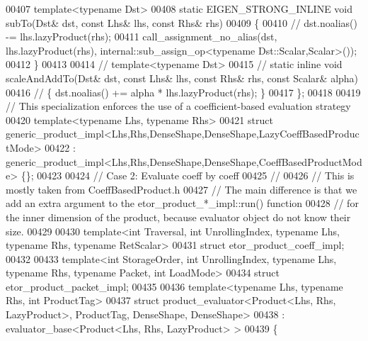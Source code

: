 \begin{DoxyCode}
00407   \textcolor{keyword}{template}<\textcolor{keyword}{typename} Dst>
00408   \textcolor{keyword}{static} EIGEN\_STRONG\_INLINE \textcolor{keywordtype}{void} subTo(Dst& dst, \textcolor{keyword}{const} Lhs& lhs, \textcolor{keyword}{const} Rhs& rhs)
00409   \{
00410     \textcolor{comment}{// dst.noalias() -= lhs.lazyProduct(rhs);}
00411     call\_assignment\_no\_alias(dst, lhs.lazyProduct(rhs), internal::sub\_assign\_op<typename
       Dst::Scalar,Scalar>());
00412   \}
00413   
00414 \textcolor{comment}{//   template<typename Dst>}
00415 \textcolor{comment}{//   static inline void scaleAndAddTo(Dst& dst, const Lhs& lhs, const Rhs& rhs, const Scalar& alpha)}
00416 \textcolor{comment}{//   \{ dst.noalias() += alpha * lhs.lazyProduct(rhs); \}}
00417 \};
00418 
00419 \textcolor{comment}{// This specialization enforces the use of a coefficient-based evaluation strategy}
00420 \textcolor{keyword}{template}<\textcolor{keyword}{typename} Lhs, \textcolor{keyword}{typename} Rhs>
00421 \textcolor{keyword}{struct }generic\_product\_impl<Lhs,Rhs,DenseShape,DenseShape,LazyCoeffBasedProductMode>
00422   : generic\_product\_impl<Lhs,Rhs,DenseShape,DenseShape,CoeffBasedProductMode> \{\};
00423 
00424 \textcolor{comment}{// Case 2: Evaluate coeff by coeff}
00425 \textcolor{comment}{//}
00426 \textcolor{comment}{// This is mostly taken from CoeffBasedProduct.h}
00427 \textcolor{comment}{// The main difference is that we add an extra argument to the etor\_product\_*\_impl::run() function}
00428 \textcolor{comment}{// for the inner dimension of the product, because evaluator object do not know their size.}
00429 
00430 \textcolor{keyword}{template}<\textcolor{keywordtype}{int} Traversal, \textcolor{keywordtype}{int} UnrollingIndex, \textcolor{keyword}{typename} Lhs, \textcolor{keyword}{typename} Rhs, \textcolor{keyword}{typename} RetScalar>
00431 \textcolor{keyword}{struct }etor\_product\_coeff\_impl;
00432 
00433 \textcolor{keyword}{template}<\textcolor{keywordtype}{int} StorageOrder, \textcolor{keywordtype}{int} UnrollingIndex, \textcolor{keyword}{typename} Lhs, \textcolor{keyword}{typename} Rhs, \textcolor{keyword}{typename} Packet, \textcolor{keywordtype}{int} LoadMode>
00434 \textcolor{keyword}{struct }etor\_product\_packet\_impl;
00435 
00436 \textcolor{keyword}{template}<\textcolor{keyword}{typename} Lhs, \textcolor{keyword}{typename} Rhs, \textcolor{keywordtype}{int} ProductTag>
00437 \textcolor{keyword}{struct }product\_evaluator<Product<Lhs, Rhs, LazyProduct>, ProductTag, DenseShape, DenseShape>
00438     : evaluator\_base<Product<Lhs, Rhs, LazyProduct> >
00439 \{

\end{DoxyCode}
